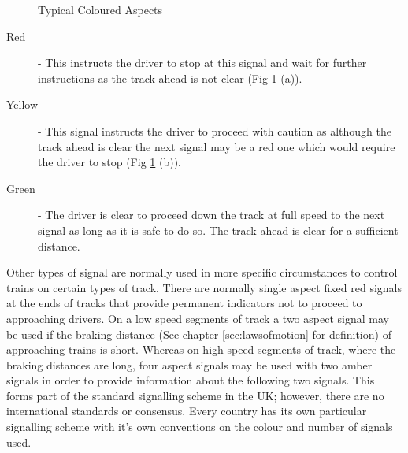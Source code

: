 \begin{figure}[h!]
\begin{center}
 \quad
{} \quad
{}

\end{center}
\caption{Typical Coloured Aspects}
\label{fig:aspects}
\end{figure}


\begin{description}

\item[Red] -  This instructs the driver to stop at this signal and wait for further instructions as the track ahead is not clear  (Fig \ref{fig:aspects} (a)). 


\item[Yellow] - This signal instructs the driver to proceed with caution as although the track ahead is clear the next signal may be a red one which would require the driver to stop (Fig \ref{fig:aspects} (b)).

\item[Green] -  The driver is clear to proceed down the track at full speed to the next signal as long as it is safe to do so. The track ahead is clear for a sufficient distance.
\end{description}

Other types of signal are normally used in more specific circumstances to control trains on certain types of track.  There are normally single aspect fixed red signals at the ends of tracks that provide permanent indicators not to proceed to approaching drivers. On a low speed segments of track a two aspect signal may be used if the braking distance (See chapter \ref{sec:lawsofmotion} for definition) of approaching trains is short. Whereas on high speed segments of track, where the  braking distances are long, four aspect signals may be used with two amber signals in order to provide information about the following two signals. This forms part of the standard signalling scheme in the UK; however, there are no international standards or consensus. Every country has its own particular signalling scheme with it's own conventions on the colour and number of signals used. 

